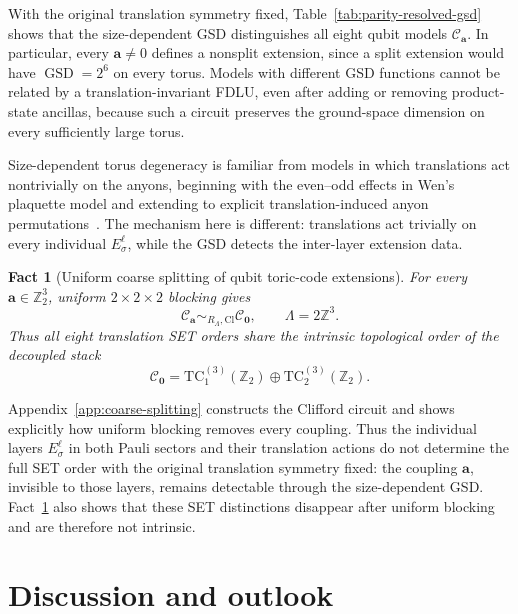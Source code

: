 \documentclass[aps,prx,english,superscriptaddress,twocolumn,tightenlines,showpacs,longbibliography,floatfix,amsfonts]{revtex4-2}
\newtheorem{fact}{Fact}
\theoremstyle{remark}
\theoremstyle{definition}
\begin{document}
With the original translation symmetry fixed,
Table~\ref{tab:parity-resolved-gsd} shows
that the size-dependent GSD distinguishes all eight qubit models
\(\mathcal C_{\mathbf a}\).  In particular, every \(\mathbf a\neq0\) defines
a nonsplit extension, since a split extension would have
\(\operatorname{GSD}=2^6\) on every torus.  Models with different GSD
functions cannot be related by a translation-invariant FDLU, even after
adding or removing product-state ancillas, because such a circuit preserves
the ground-space dimension on every sufficiently large torus.

Size-dependent torus degeneracy is familiar from models in which translations
act nontrivially on the anyons, beginning with the even--odd effects in Wen's
plaquette model and extending to explicit translation-induced anyon
permutations~\cite{Wen2003QuantumOrders,Watanabe2023GSD,
Chen2025PRL,He2026PRB}. The
mechanism here is different: translations act trivially on every individual
\(E_\sigma^\ell\), while the GSD detects the inter-layer extension data.

\begin{fact}[Uniform coarse splitting of qubit toric-code extensions]
	\label{fact:coarse-splitting}
	For every \(\mathbf a\in\mathbb Z_2^3\), uniform
	\(2\times2\times2\) blocking gives
	\begin{equation}
		\mathcal C_{\mathbf a}
		\sim_{R_{\Lambda},\mathrm{Cl}}
		\mathcal C_{\mathbf0},
		\qquad \Lambda=2\mathbb Z^3.
	\end{equation}
	Thus all eight translation SET orders share the intrinsic topological order
	of the decoupled stack
	\begin{equation}
		\mathcal C_{\mathbf0}
		=
		\mathrm{TC}^{(3)}_1(\mathbb Z_2)
		\oplus
		\mathrm{TC}^{(3)}_2(\mathbb Z_2).
	\end{equation}
\end{fact}

Appendix~\ref{app:coarse-splitting} constructs the Clifford circuit and
shows explicitly how uniform blocking removes every coupling. Thus the
individual layers \(E_\sigma^\ell\) in both Pauli sectors and their translation
actions do not determine the full SET order with the original translation
symmetry fixed:
the coupling \(\mathbf a\), invisible to those layers, remains detectable
through the size-dependent GSD. Fact~\ref{fact:coarse-splitting} also shows
that these SET distinctions disappear after uniform blocking and
are therefore not intrinsic.

\section{Discussion and outlook}
\label{sec:postnikov-outlook}
\end{document}

